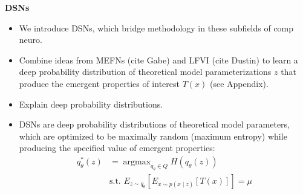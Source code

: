 \documentclass[11pt]{article}
\DeclareMathOperator*{\argmax}{argmax}
\begin{document}
\textbf{DSNs}
\begin{itemize}
\item We introduce DSNs, which bridge methodology in these subfields of comp neuro.
\item  Combine ideas from MEFNs (cite Gabe) and LFVI (cite Dustin) to learn a deep probability distribution of theoretical model parameterizations $z$ that produce the emergent properties of interest $T(x)$ (see Appendix).  
\item Explain deep probability distributions.
\item DSNs are deep probability distributions of theoretical model parameters, which are optimized to be maximally random (maximum entropy) while producing the specified value of emergent properties:
\begin{equation}
\begin{split}
q_\theta^*(z) &= \argmax_{q_\theta \in Q} H(q_\theta(z)) \\
 &  \text{s.t.  } E_{z \sim q_\theta}\left[ E_{x\sim p(x \mid z)}\left[T(x)\right] \right] = \mu \\
 \end{split}
\end{equation}
\end{itemize}
\end{document}
